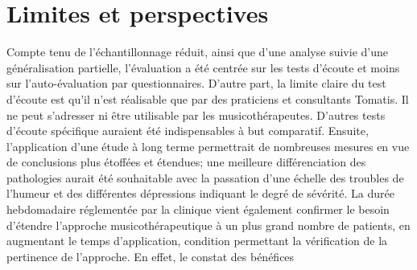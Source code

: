 \section{Limites et perspectives}
Compte tenu  de l'échantillonnage réduit, ainsi que d'une analyse
suivie d'une généralisation partielle, l'évaluation a été centrée sur les
tests d'écoute et moins sur
l'auto-évaluation par questionnaires.
D'autre part, la limite claire du test d'écoute est qu'il n'est réalisable que par des praticiens et 
consultants 
Tomatis.
Il ne peut s'adresser ni être utilisable par les musicothérapeutes. 	D'autres tests d'écoute spécifique 
auraient été indispensables à but
comparatif.
Ensuite, l'application d'une étude à long terme permettrait  de nombreuses
mesures en vue de conclusions plus étoffées et étendues;  
une meilleure différenciation des pathologies aurait été souhaitable avec la 
passation d'une échelle des troubles de l'humeur et des différentes
dépressions indiquant le degré de sévérité.
La durée hebdomadaire réglementée par la clinique vient également 
confirmer le besoin d'étendre l'approche musicothérapeutique à
un plus grand nombre de patients, en augmentant le temps
d'application, condition permettant la vérification de la
pertinence de l'approche. En effet, le constat des bénéfices
